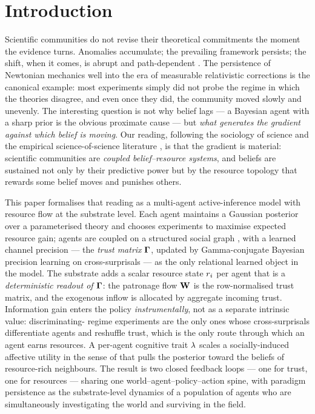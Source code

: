 \section{Introduction}
\label{sec:intro}

Scientific communities do not revise their theoretical commitments the
moment the evidence turns. Anomalies accumulate; the prevailing
framework persists; the shift, when it comes, is abrupt and
path-dependent \citep{kuhn1962Structure}. The persistence of Newtonian
mechanics well into the era of measurable relativistic corrections is
the canonical example: most experiments simply did not probe the
regime in which the theories disagree, and even once they did, the
community moved slowly and unevenly. The interesting question is not
why belief lags --- a Bayesian agent with a sharp prior is the obvious
proximate cause --- but \emph{what generates the gradient against
which belief is moving}. Our reading, following the sociology of
science \citep{bourdieu1975ScientificField} and the empirical
science-of-science literature \citep{wang2021ScienceOfScience,
azoulay2019StarsShadow}, is that the gradient is material: scientific
communities are \emph{coupled belief--resource systems}, and beliefs
are sustained not only by their predictive power but by the resource
topology that rewards some belief moves and punishes others.

This paper formalises that reading as a multi-agent active-inference
model with resource flow at the substrate level. Each agent
\citep{friston2015ActiveInferenceEpistemic} maintains a Gaussian
posterior over a parameterised theory and chooses experiments to
maximise expected resource gain; agents are coupled on a structured
social graph \citep{wattsStrogatz1998SmallWorld,
albarracin2022EpistemicCommunities}, with a learned channel precision
--- the \emph{trust matrix} $\boldsymbol{\Gamma}$, updated by Gamma-conjugate
Bayesian precision learning on cross-surprisals --- as the only
relational learned object in the model. The substrate adds a scalar
resource state $r_{i}$ per agent that is a \emph{deterministic
readout of $\boldsymbol{\Gamma}$}: the patronage flow $\mathbf{W}$ is the
row-normalised trust matrix, and the exogenous inflow is allocated by
aggregate incoming trust. Information gain enters the policy
\emph{instrumentally}, not as a separate intrinsic value: discriminating-%
regime experiments are the only ones whose cross-surprisals
differentiate agents and reshuffle trust, which is the only route
through which an agent earns resources. A per-agent cognitive trait
$\lambda$ scales a socially-induced affective utility in the sense of
\citet{hylandAlbarracin2025MindChange} that pulls the posterior
toward the beliefs of resource-rich neighbours. The result is two
closed feedback loops --- one for trust, one for resources --- sharing
one world--agent--policy--action spine, with paradigm persistence as
the substrate-level dynamics of a population of agents who are
simultaneously investigating the world and surviving in the field.

